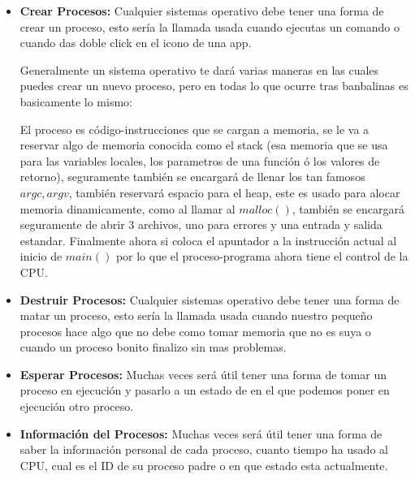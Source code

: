 \documentclass[12pt, fleqn]{report}                             %
\newcommand \Quote {\qq}                                        %
\begin{document}
                \begin{itemize}
                    \item
                        \textbf{Crear Procesos:}
                        Cualquier sistemas operativo debe tener una 
                        forma de crear un proceso, esto sería la llamada usada
                        cuando ejecutas un comando o cuando das doble click en el icono
                        de una app.

                        Generalmente un sistema operativo te dará varias maneras en 
                        las cuales puedes crear un nuevo proceso, pero en todas lo
                        que ocurre tras banbalinas es basicamente lo mismo:

                        El proceso es código-instrucciones que se cargan a memoria,
                        se le va a reservar algo de memoria conocida como el stack 
                        (esa memoria que se usa para las variables locales, los 
                        parametros de una función ó los valores de retorno), seguramente
                        también se encargará de llenar los tan famosos $argc, argv$,
                        también reservará espacio para el heap, este es usado
                        para alocar memoria dinamicamente, como al llamar al $malloc()$,
                        también se encargará seguramente de abrir 3 archivos, uno para
                        errores y una entrada y salida estandar. Finalmente ahora si
                        coloca el apuntador a la instrucción actual al inicio de $main()$
                        por lo que el proceso-programa ahora tiene el control de la CPU.

                    \item
                        \textbf{Destruir Procesos:}
                        Cualquier sistemas operativo debe tener una 
                        forma de matar un proceso, esto sería la llamada usada
                        cuando nuestro pequeño procesos hace algo que no debe como
                        tomar memoria que no es suya o cuando un proceso bonito finalizo
                        sin mas problemas.

                    \item
                        \textbf{Esperar Procesos:}
                        Muchas veces será útil tener una forma de tomar un proceso
                        en ejecución y pasarlo a un estado de \Quote{idle} en el
                        que podemos poner en ejecución otro proceso.

                    \item
                        \textbf{Información del Procesos:}
                        Muchas veces será útil tener una forma de saber la información
                        personal de cada proceso, cuanto tiempo ha usado al CPU, cual
                        es el ID de su proceso padre o en que estado esta actualmente.
                 \end{itemize} 
\end{document}
